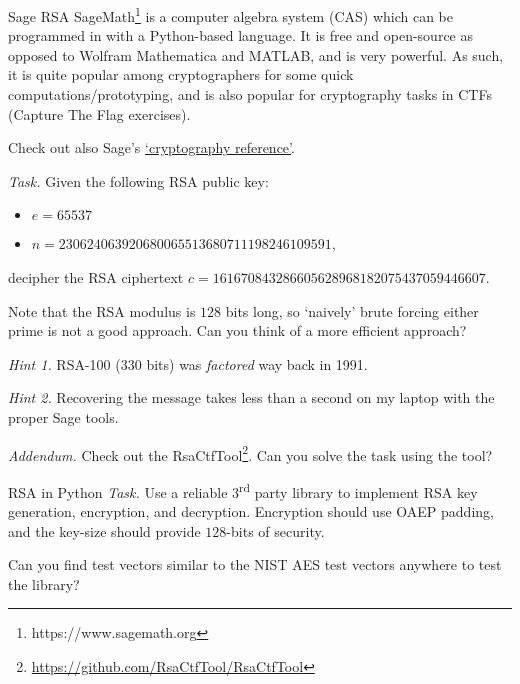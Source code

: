 \documentclass{practice}
\begin{document}
\begin{task}{Sage RSA}
  SageMath\footnote{https://www.sagemath.org} is a computer algebra system (CAS) which can be programmed in with a Python-based language.
  It is free and open-source as opposed to Wolfram Mathematica and MATLAB, and is very powerful.
  As such, it is quite popular among cryptographers for some quick computations/prototyping, and is also popular for cryptography tasks in CTFs (Capture The Flag exercises).

  Check out also Sage's \href{https://doc.sagemath.org/html/en/reference/cryptography/index.html}{`cryptography reference'}.

  \textit{Task.}
  Given the following RSA public key:
  \begin{itemize}
    \item $e = 65537$
    \item $n = 230624063920680065513680711198246109591$,
  \end{itemize}
  decipher the RSA ciphertext $c = 161670843286605628968182075437059446607$.

  Note that the RSA modulus is $128$ bits long, so `naively' brute forcing either prime is not a good approach.
  Can you think of a more efficient approach?
  
  \textit{Hint 1.}
  RSA-100 ($330$ bits) was \emph{factored} way back in 1991.

  \textit{Hint 2.}
  Recovering the message takes less than a second on my laptop with the proper Sage tools.

  \textit{Addendum.}
  Check out the RsaCtfTool\footnote{\url{https://github.com/RsaCtfTool/RsaCtfTool}}.
  Can you solve the task using the tool?
\end{task}

\begin{task}{RSA in Python}
  \textit{Task.}
  Use a reliable 3\textsuperscript{rd} party library to implement RSA key generation, encryption, and decryption.
  Encryption should use OAEP padding, and the key-size should provide $128$-bits of security.

  Can you find test vectors similar to the NIST AES test vectors anywhere to test the library?
\end{task}
\end{document}
